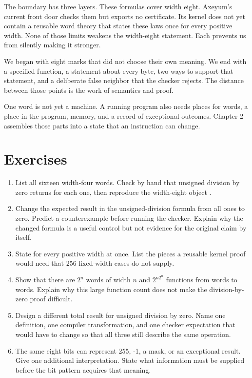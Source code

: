 The boundary has three layers. These formulas cover width eight. Axeyum's
current front door checks them but exports no certificate. Its kernel does not
yet contain a reusable word theory that states these laws once for every
positive width. None of those limits weakens the width-eight statement. Each
prevents us from silently making it stronger.

We began with eight marks that did not choose their own meaning. We end with a
specified function, a statement about every byte, two ways to support that
statement, and a deliberate false neighbor that the checker rejects. The
distance between those points is the work of semantics and proof.

One word is not yet a machine. A running program also needs places for words,
a place in the program, memory, and a record of exceptional outcomes. Chapter
2 assembles those parts into a state that an instruction can change.

\section{Exercises}

\begin{enumerate}
\item List all sixteen width-four words. Check by hand that unsigned division
by zero returns  for each one, then reproduce the width-eight
object .
\item Change the expected result in the unsigned-division formula from all
ones to zero. Predict a counterexample before running the checker. Explain why
the changed formula is a useful control but not evidence for the original
claim by itself.
\item State  for every positive width at once. List the pieces
a reusable kernel proof would need that 256 fixed-width cases do not supply.
\item Show that there are \(2^n\) words of width \(n\) and
\(2^{n2^n}\) functions from words to words. Explain why this large function
count does not make the division-by-zero proof difficult.
\item Design a different total result for unsigned division by zero. Name one
definition, one compiler transformation, and one checker expectation that
would have to change so that all three still describe the same operation.
\item The same eight bits can represent 255, -1, a mask, or an exceptional
result. Give one additional interpretation. State what information must be
supplied before the bit pattern acquires that meaning.
\end{enumerate}
